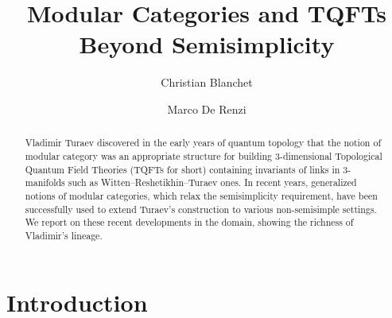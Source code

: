 \documentclass[a4paper,reqno]{amsart}
\theoremstyle{definition}
\theoremstyle{remark}
\begin{document}
\raggedbottom


\title{Modular Categories and TQFTs Beyond Semisimplicity}

\author[C. Blanchet]{Christian Blanchet} 
\address{Université de Paris, Sorbonne Université, CNRS, IMJ-PRG, F-75006 Paris, France}

\author[M. De Renzi]{Marco De Renzi} 
\address{Institute of Mathematics, University of Zurich, Winterthurerstrasse 190, CH-8057 Zurich, Switzerland} 



\begin{abstract}
 Vladimir Turaev discovered in the early years of quantum topology that the notion of modular category was an appropriate structure for building 3-di\-men\-sion\-al Topological Quantum Field Theories (TQFTs for short) containing invariants of links in 3-manifolds such as Witten--Reshetikhin--Turaev ones. In recent years, generalized notions of modular categories, which relax the semisimplicity requirement, have been successfully used to extend Turaev's construction to various non-semisimple settings. We report on these recent developments in the domain, showing the richness of Vladimir's lineage.
\end{abstract}

\maketitle
\setcounter{tocdepth}{3}

\section{Introduction}
\end{document}
